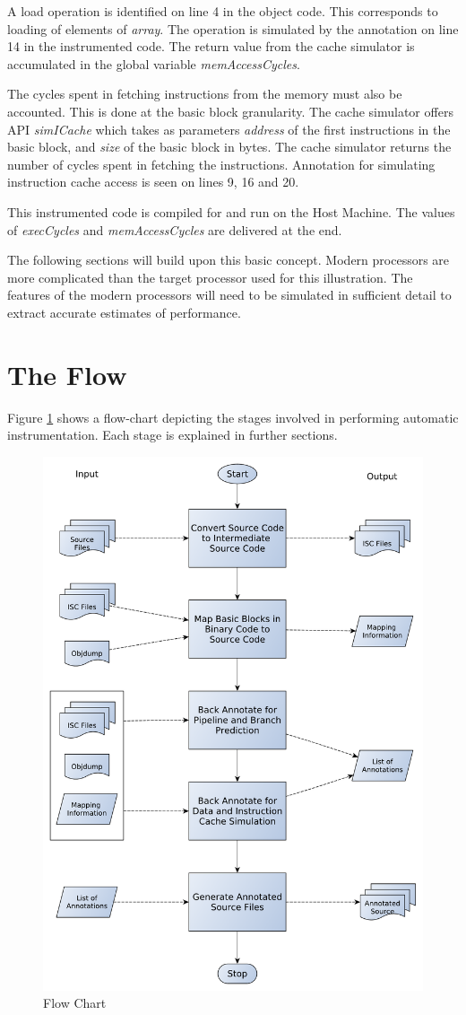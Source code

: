 A load operation is identified on line 4 in the object code. This corresponds to loading of elements of \emph{array}. The operation is simulated by the annotation on line 14 in the instrumented code. The return value from the cache simulator is accumulated in the global variable \emph{memAccessCycles}.

The cycles spent in fetching instructions from the memory must also be accounted. This is done at the basic block granularity. The cache simulator offers API \emph{simICache} which takes as parameters \emph{address} of the first instructions in the basic block, and \emph{size} of the basic block in bytes. The cache simulator returns the number of cycles spent in fetching the instructions. Annotation for simulating instruction cache access is seen on lines 9, 16 and 20.

This instrumented code is compiled for and run on the Host Machine. The values of \emph{execCycles} and \emph{memAccessCycles} are delivered at the end. 

The following sections will build upon this basic concept. Modern processors are more complicated than the target processor used for this illustration. The features of the modern processors will need to be simulated in sufficient detail to extract accurate estimates of performance.

\section{The Flow}

Figure \ref{fig:hcsFlowChart} shows a flow-chart depicting the stages involved in performing automatic instrumentation. Each stage is explained in further sections.

\begin{figure}[h!]
\center
\includegraphics[width=.73\textwidth]{figures/HCS_FlowChart.pdf}
\caption{Flow Chart}
\label{fig:hcsFlowChart}
\end{figure}

